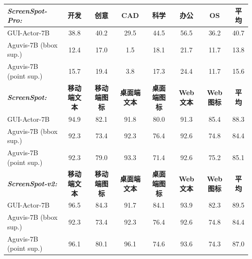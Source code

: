 \begin{table}[h]
{\begin{tabular}{lccccccc}
\toprule
\textit{\textbf{ScreenSpot-Pro:}}& \textbf{开发} & \textbf{创意} & \textbf{CAD} & \textbf{科学} & \textbf{办公} & \textbf{OS} & \textbf{平均} \\
\midrule
GUI-Actor-7B& 38.8 & 40.2 & 29.5 & 44.5 & 56.5 & 36.2 & 40.7 \\
Aguvis-7B (bbox sup.) & 12.4 & 17.0 & 1.5 & 18.1 & 21.7 & 11.7 & 13.8\\
Aguvis-7B (point sup.) & 15.7 & 19.4 & 3.8 & 17.3 & 24.4 & 11.7 & 15.6 \\
\midrule
\textit{\textbf{ScreenSpot:}} & \textbf{移动端文本} & \textbf{移动端图标} & \textbf{桌面端文本} & \textbf{桌面端图标} & \textbf{Web 文本} & \textbf{Web 图标} & \textbf{平均} \\
\midrule
GUI-Actor-7B& 94.9 & 82.1 & 91.8 & 80.0& 91.3 & 85.4 & 88.3 \\
Aguvis-7B (bbox sup.) & 92.3 & 73.4 & 92.3 & 76.4 & 92.6 & 74.8 & 84.4\\
Aguvis-7B (point sup.) & 92.3 & 79.0 & 93.3 & 71.4 & 92.6 & 75.2 & 85.1\\
\midrule
\textit{\textbf{ScreenSpot-v2:}} & \textbf{移动端文本} & \textbf{移动端图标} & \textbf{桌面端文本} & \textbf{桌面端图标} & \textbf{Web 文本} & \textbf{Web 图标} & \textbf{平均} \\
\midrule
GUI-Actor-7B& 96.5 & 84.3 & 91.7 & 84.1 & 93.9 & 82.3 & 89.5 \\
Aguvis-7B (bbox sup.) & 92.3 & 73.4 & 92.3 & 76.4 & 92.6 & 74.8 & 84.4 \\
Aguvis-7B (point sup.) & 96.1 & 80.1 & 96.1 & 74.6 & 93.6 & 74.3 & 87.0\\
\bottomrule
\end{tabular}

\vspace{-0.5em}
}
\label{tab:ablation}
\end{table}
